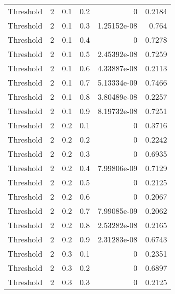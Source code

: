 \documentclass{article}
\begin{document}
\begin{longtable}[H]{lrrrrr}
 Threshold      &       2 &   0.1 &            0.2 &      0           &          0.2184 \\
 Threshold      &       2 &   0.1 &            0.3 &      1.25152e-08 &          0.764  \\
 Threshold      &       2 &   0.1 &            0.4 &      0           &          0.7278 \\
 Threshold      &       2 &   0.1 &            0.5 &      2.45392e-08 &          0.7259 \\
 Threshold      &       2 &   0.1 &            0.6 &      4.33887e-08 &          0.2113 \\
 Threshold      &       2 &   0.1 &            0.7 &      5.13334e-09 &          0.7466 \\
 Threshold      &       2 &   0.1 &            0.8 &      3.80489e-08 &          0.2257 \\
 Threshold      &       2 &   0.1 &            0.9 &      8.19732e-08 &          0.7251 \\
 Threshold      &       2 &   0.2 &            0.1 &      0           &          0.3716 \\
 Threshold      &       2 &   0.2 &            0.2 &      0           &          0.2242 \\
 Threshold      &       2 &   0.2 &            0.3 &      0           &          0.6935 \\
 Threshold      &       2 &   0.2 &            0.4 &      7.99806e-09 &          0.7129 \\
 Threshold      &       2 &   0.2 &            0.5 &      0           &          0.2125 \\
 Threshold      &       2 &   0.2 &            0.6 &      0           &          0.2067 \\
 Threshold      &       2 &   0.2 &            0.7 &      7.99085e-09 &          0.2062 \\
 Threshold      &       2 &   0.2 &            0.8 &      2.53282e-08 &          0.2165 \\
 Threshold      &       2 &   0.2 &            0.9 &      2.31283e-08 &          0.6743 \\
 Threshold      &       2 &   0.3 &            0.1 &      0           &          0.2351 \\
 Threshold      &       2 &   0.3 &            0.2 &      0           &          0.6897 \\
 Threshold      &       2 &   0.3 &            0.3 &      0           &          0.2125 \\

\end{longtable}
\end{document}

